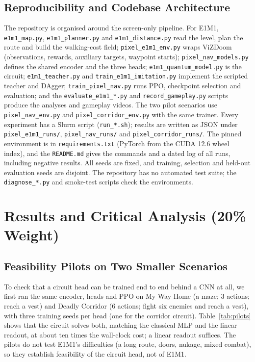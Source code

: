 \documentclass[10pt, a4paper]{article}
\begin{document}
\subsection{Reproducibility and Codebase Architecture}
The repository is organised around the screen-only pipeline. For E1M1, \texttt{e1m1\_map.py}, \texttt{e1m1\_planner.py} and \texttt{e1m1\_distance.py} read the level, plan the route and build the walking-cost field; \texttt{pixel\_e1m1\_env.py} wraps ViZDoom (observations, rewards, auxiliary targets, waypoint starts); \texttt{pixel\_nav\_models.py} defines the shared encoder and the three heads; \texttt{e1m1\_quantum\_model.py} is the circuit; \texttt{e1m1\_teacher.py} and \texttt{train\_e1m1\_imitation.py} implement the scripted teacher and DAgger; \texttt{train\_pixel\_nav.py} runs PPO, checkpoint selection and evaluation; and the \texttt{evaluate\_e1m1\_*.py} and \texttt{record\_gameplay.py} scripts produce the analyses and gameplay videos. The two pilot scenarios use \texttt{pixel\_nav\_env.py} and \texttt{pixel\_corridor\_env.py} with the same trainer. Every experiment has a Slurm script (\texttt{run\_*.sh}); results are written as JSON under \texttt{pixel\_e1m1\_runs/}, \texttt{pixel\_nav\_runs/} and \texttt{pixel\_corridor\_runs/}. The pinned environment is in \texttt{requirements.txt} (PyTorch from the CUDA 12.6 wheel index), and the \texttt{README.md} gives the commands and a dated log of all runs, including negative results. All seeds are fixed, and training, selection and held-out evaluation seeds are disjoint. The repository has no automated test suite; the \texttt{diagnose\_*.py} and smoke-test scripts check the environments.

\section{Results and Critical Analysis (20\% Weight)}
\label{sec:results_analysis}

\subsection{Feasibility Pilots on Two Smaller Scenarios}
\label{sec:pilots}
To check that a circuit head can be trained end to end behind a CNN at all, we first ran the same encoder, heads and PPO on My Way Home (a maze; 3 actions; reach a vest) and Deadly Corridor (6 actions; fight six enemies and reach a vest), with three training seeds per head (one for the corridor circuit). Table~\ref{tab:pilots} shows that the circuit solves both, matching the classical MLP and the linear readout, at about ten times the wall-clock cost; a linear readout suffices. The pilots do not test E1M1's difficulties (a long route, doors, nukage, mixed combat), so they establish feasibility of the circuit head, not of E1M1.
\end{document}
